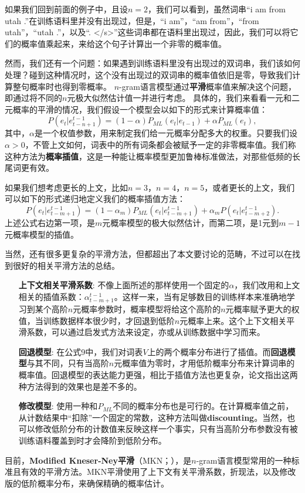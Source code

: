 \documentclass[10pt,a4paper]{ctexart}
\begin{document}
如果我们回到前面的例子中，且设$n=2$，我们可以看到，虽然词串“i am from utah .”在训练语料里并没有出现过，但是，“i am”，“am from”，“from utah”，“utah .”，以及“. </s>”这些词串都在语料里出现过，因此，我们可以将它们的概率值乘起来，来给这个句子计算出一个非零的概率值。

然而，我们还有一个问题：如果遇到训练语料里没有出现过的双词串，我们该如何处理？碰到这种情况时，这个没有出现过的双词串的概率值依旧是零，导致我们计算整句概率时也得到零概率。
$n$-gram语言模型通过\textbf{平滑}概率值来解决这个问题，即通过将不同的$n$元极大似然估计值一并进行考虑。
具体的，我们来看看一元和二元概率的平滑的情况，我们假设一个模型会以如下的形式来计算概率值：
\[
 P(e_t|e_{t-n+1}^{t-1}) = (1 - \alpha)P_{ML}(e_t|e_{t-1}) + \alpha P_{ML}(e_t),
\]
其中，$\alpha$是一个权值参数，用来制定我们给一元概率分配多大的权重。只要我们设$\alpha > 0$，不管上文如何，词表中的所有词条都会被赋予一定的非零概率值。我们称这种方法为\textbf{概率插值}，这是一种能让概率模型更加鲁棒标准做法，对那些低频的长尾词更有效。

如果我们想考虑更长的上文，比如$n=3$，$n=4$，$n=5$，或者更长的上文，我们可以如下的形式递归地定义我们的概率插值方法：
\[
 P(e_t|e_{t-m+1}^{t-1}) = (1 - \alpha_{m})P_{ML}(e_t|e_{t-m+1}^{t-1}) + \alpha_{m}P(e_t|e_{t-m+2}^{t-1}).
\]
上述公式右边第一项，是$m$元概率模型的极大似然估计，而第二项，是1元到$m-1$元概率模型的插值。

当然，还有很多更复杂的平滑方法，但都超出了本文要讨论的范畴，不过可以在\cite{chen1996empirical}找到很好的相关平滑方法的总结。

\begin{enumerate}
\item[\textbf{上下文相关平滑系数}:] 不像上面所述的那样使用一个固定的$\alpha$，我们改用和上文相关的插值系数：$\alpha_{t-m+1}^{t-1}$。这样一来，当有足够数目的训练样本来准确地学习到某个高阶$n$元概率参数时，概率模型将给这个高阶的$n$元概率赋予更大的权值，当训练数据样本很少时，才回退到低阶$n$元概率上来。这个上下文相关平滑系数，可以通过启发式方法来设定\cite{witten1991zero}，亦或从训练数据中学习而来\cite{neubig2016generalizing}。
\item[\textbf{回退模型}:] 在公式9中，我们对词表$V$上的两个概率分布进行了插值。而\textbf{回退模型}与其不同，只有当高阶$n$元概率值为零时，才用低阶概率分布来计算词串的概率值。回退模型的表达能力更强，相比于插值方法也更复杂，论文\cite{goodman2001bit}指出这两种方法得到的效果也是差不多的\cite{goodman2001bit}。
\item[\textbf{修改模型}:] 使用一种和$P_{ML}$不同的概率分布也是可行的。在计算概率值之前，从计数结果中“扣除”一个固定的常数，这种方法叫做\textbf{discounting}。当然，也可以修改低阶分布的计数值来反映这样一个事实，只有当高阶分布参数没有被训练语料覆盖到时才会降阶到低阶分布。
\end{enumerate}
目前，\textbf{Modified Kneser-Ney平滑}（MKN；\cite{chen1996empirical}），是$n$-gram语言模型常用的一种标准且有效的平滑方法。MKN平滑使用了上下文有关平滑系数，折现法，以及修改版的低阶概率分布，来确保精确的概率估计。
\end{document}
